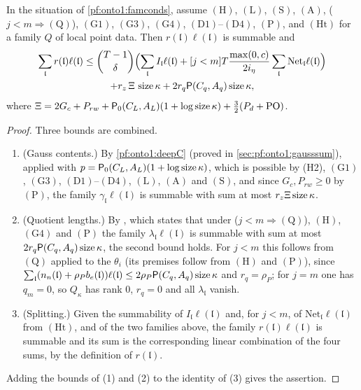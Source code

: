 \begin{proposition}\label{pf:onto1:rLa_tsum}
In the situation of \cref{pf:onto1:famconds}, assume $(\mathrm H)$, $(\mathrm L)$, $(\mathrm S)$, $(\mathrm A)$,
($j<m\Rightarrow(\mathrm Q)$), $(\mathrm G1)$, $(\mathrm G3)$, $(\mathrm G4)$, $(\mathrm D1)$--$(\mathrm D4)$, $(\mathrm P)$, and
$(\mathrm{Ht})$ for a family $Q$ of local point data. Then $r(\mathfrak l)\ell(\mathfrak l)$ is summable and
\begin{multline*}
\sum_{\mathfrak l}r(\mathfrak l)\ell(\mathfrak l)\le\binom{T-1}{\delta}\Bigl(\sum_{\mathfrak l}I_{\mathfrak l}\ell(\mathfrak l)+[j<m]
T\frac{\max(0,c)}{2i_\eta}\sum_{\mathfrak l}\mathrm{Net}_{\mathfrak l}\ell(\mathfrak l)\Bigr)\\
+r_z\,\Xi\,\operatorname{size}\kappa+2r_q\mathsf{P}(C_q,A_q)\operatorname{size}\kappa,
\end{multline*}
where $\Xi=2G_c+P_{rw}+\mathsf{P}_0(C_L,A_L)(1+\log\operatorname{size}\kappa)+\tfrac32(P_d+\mathrm{PO})$.
\end{proposition}

\begin{proof}
Three bounds are combined.
\begin{enumerate}
\item (Gauss contents.) By \cref{pf:onto1:deepC} (proved in \cref{sec:pf:onto1:gausssum}), applied with
$p=\mathsf{P}_0(C_L,A_L)(1+\log\operatorname{size}\kappa)$, which is possible by (H2), $(\mathrm G1)$, $(\mathrm G3)$, $(\mathrm D1)$--$(\mathrm
D4)$, $(\mathrm L)$, $(\mathrm A)$ and $(\mathrm S)$, and since $G_c,P_{rw}\ge0$ by $(\mathrm P)$, the family $\gamma_{\mathfrak
l}\ell(\mathfrak l)$ is summable with sum at most $r_z\Xi\operatorname{size}\kappa$.
\item (Quotient lengths.) By , which states that under
($j<m\Rightarrow(\mathrm Q)$), $(\mathrm H)$, $(\mathrm G4)$ and $(\mathrm P)$ the family $\lambda_{\mathfrak l}\ell(\mathfrak l)$ is
summable with sum at most $2r_q\mathsf{P}(C_q,A_q)\operatorname{size}\kappa$, the second bound holds. For $j<m$ this follows from
$(\mathrm Q)$ applied to the $\theta_i$ (its premises follow from $(\mathrm H)$ and $(\mathrm P)$), since
$\sum_{\mathfrak l}(n_n(\mathfrak l)+\rho_Pb_e(\mathfrak l))\ell(\mathfrak l)\le2\rho_P\mathsf{P}(C_q,A_q)\operatorname{size}\kappa$ and
$r_q=\rho_P$; for $j=m$ one has $q_m=0$, so $Q_\kappa$ has rank $0$, $r_q=0$ and all $\lambda_{\mathfrak l}$ vanish.
\item (Splitting.) Given the summability of $I_{\mathfrak l}\ell(\mathfrak l)$ and, for $j<m$, of
$\mathrm{Net}_{\mathfrak l}\ell(\mathfrak l)$ from $(\mathrm{Ht})$, and of the two families above, the family $r(\mathfrak
l)\ell(\mathfrak l)$ is summable and its sum is the corresponding linear combination of the four sums, by the
definition of $r(\mathfrak l)$.
\end{enumerate}
Adding the bounds of (1) and (2) to the identity of (3) gives the assertion.
\end{proof}

